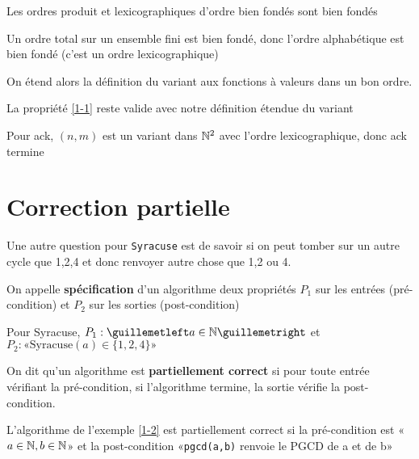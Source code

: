 \begin{proposition}
	Les ordres produit et lexicographiques d'ordre bien fondés sont bien fondés
\end{proposition}

\begin{example}
	Un ordre total sur un ensemble fini est bien fondé, donc l'ordre alphabétique est bien fondé (c'est un ordre lexicographique)
\end{example}

\begin{definition}
	On étend alors la définition du variant aux fonctions à valeurs dans un bon ordre.
\end{definition}

\begin{proposition}
	La propriété \ref{1-1} reste valide avec notre définition étendue du variant
\end{proposition}

\begin{example}
	Pour ack, $(n,m)$ est un variant dans $\mathbb{N}^2$ avec l'ordre lexicographique, donc ack termine
\end{example}

\section{Correction partielle}

Une autre question pour \texttt{Syracuse} est de savoir si on peut tomber sur un autre cycle que 1,2,4 et donc renvoyer autre chose que 1,2 ou 4.

\begin{definition}
	On appelle \textbf{spécification} d'un algorithme deux propriétés $P_1$ sur les entrées (pré-condition) et $P_2$ sur les sorties (post-condition)
\end{definition}

\begin{example}
	Pour Syracuse, $P_1 : «a\in \N»$ et $P_2 : «\text{Syracuse}(a) \in \{1,2,4\}»$
\end{example}

\begin{definition}
	On dit qu'un algorithme est \textbf{partiellement correct} si pour toute entrée vérifiant la pré-condition, si l'algorithme termine, la sortie vérifie la post-condition.
\end{definition}

\begin{example}
	L'algorithme de l'exemple \ref{1-2} est partiellement correct si la pré-condition est «$a\in \mathbb{N}, b \in \mathbb{N}$» et la post-condition «\texttt{pgcd(a,b)} renvoie le PGCD de a et de b» \label{1-3}
\end{example}

